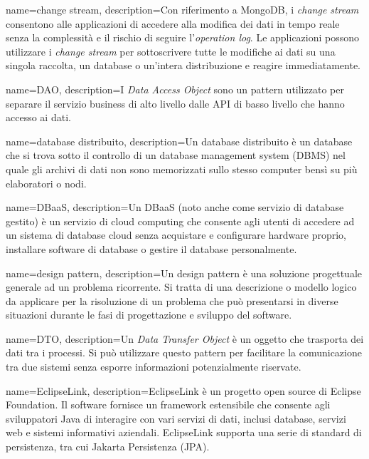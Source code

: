 

{
    name=change stream,
    description={Con riferimento a MongoDB, i \textit{change stream} consentono alle applicazioni di accedere alla modifica dei dati in tempo reale senza la complessità e il rischio di seguire l'\textit{operation log}. Le applicazioni possono utilizzare i \textit{change stream} per sottoscrivere tutte le modifiche ai dati su una singola raccolta, un database o un'intera distribuzione e reagire immediatamente.}
}

{
    name=DAO,
    description={I \textit{Data Access Object} sono un pattern utilizzato per separare il servizio business di alto livello dalle API di basso livello che hanno accesso ai dati.}
}

{
    name=database distribuito,
    description={Un database distribuito è un database che si trova sotto il controllo di un database management system (DBMS) nel quale gli archivi di dati non sono memorizzati sullo stesso computer bensì su più elaboratori o nodi.}
}

{
    name=DBaaS,
    description={Un DBaaS (noto anche come servizio di database gestito) è un servizio di cloud computing che consente agli utenti di accedere ad un sistema di database cloud senza acquistare e configurare hardware proprio, installare software di database o gestire il database personalmente.}
}

{
    name=design pattern,
    description={Un design pattern è una soluzione progettuale generale ad un problema ricorrente. Si tratta di una descrizione o modello logico da applicare per la risoluzione di un problema che può presentarsi in diverse situazioni durante le fasi di progettazione e sviluppo del software.}
}

{
    name=DTO,
    description={Un \textit{Data Transfer Object} è un oggetto che trasporta dei dati tra i processi. Si può utilizzare questo pattern per facilitare la comunicazione tra due sistemi senza esporre informazioni potenzialmente riservate.}
}

{
    name=EclipseLink,
    description={EclipseLink è un progetto open source di Eclipse Foundation. Il software fornisce un framework estensibile che consente agli sviluppatori Java di interagire con vari servizi di dati, inclusi database, servizi web e sistemi informativi aziendali. EclipseLink supporta una serie di standard di persistenza, tra cui Jakarta Persistenza (JPA).}
}


